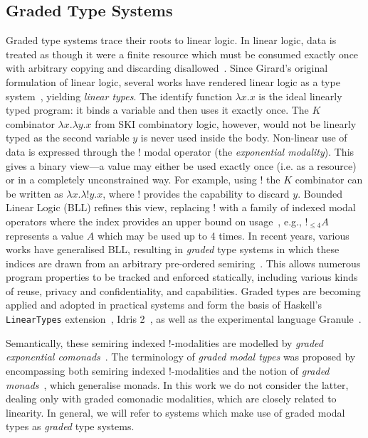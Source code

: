 \subsection{Graded Type Systems}

Graded type systems trace their roots to linear logic. In linear logic, data is
treated as though it were a finite resource which must be consumed exactly once
with arbitrary copying and discarding disallowed~\citep{girard1987linear}. Since
Girard's original formulation of linear logic, several works have rendered
linear logic as a type system~\citep{DBLP:conf/ifip2/Wadler90,ABRAMSKY19933},
yielding \emph{linear types}. The identify function $\lambda x . x$ is the ideal
linearly typed program: it binds a variable and then uses it exactly once. The
$K$ combinator $\lambda x . \lambda y . x$ from SKI combinatory logic, however,
would not be linearly typed as the second variable $y$ is never used inside the
body. Non-linear use of data is expressed through the $!$ modal operator (the
\emph{exponential modality}). This gives a binary view---a value may either be
used exactly once (i.e. as a resource) or in a completely unconstrained way. For
example, using $!$ the $K$ combinator can be written as $\lambda x. \lambda !y .
x$, where $!$ provides the capability to discard $y$. Bounded Linear Logic (BLL)
refines this view, replacing ! with a family of indexed modal operators where
the index provides an upper bound on usage~\citep{girard1992bounded}, e.g.,
$!_{\leq 4}A$ represents a value $A$ which may be used up to 4 times. In recent
years, various works have generalised BLL, resulting in \textit{graded} type
systems in which these indices are drawn from an arbitrary pre-ordered
semiring~\citep{DBLP:conf/esop/BrunelGMZ14,DBLP:conf/esop/GhicaS14,petricek2014coeffects,DBLP:journals/pacmpl/AbelB20,DBLP:journals/pacmpl/ChoudhuryEEW21,quantitative-type-theory,McBride2016}.
This allows numerous program properties to be tracked and enforced statically,
including various kinds of reuse, privacy and confidentiality, and capabilities.
Graded types are becoming applied and adopted in practical systems and form the
basis of Haskell's \texttt{LinearTypes}
extension~\citep{DBLP:journals/pacmpl/BernardyBNJS18}, Idris
2~\citep{DBLP:journals/corr/abs-2104-00480}, as well as the experimental
language Granule~\citep{DBLP:journals/pacmpl/OrchardLE19}.

Semantically, these semiring indexed $!$-modalities are modelled by \emph{graded
exponential comonads}~\citep{DBLP:conf/icfp/GaboardiKOBU16}. The terminology of
\textit{graded modal types} was proposed
by~\citet{DBLP:journals/pacmpl/OrchardLE19} encompassing both semiring indexed
!-modalities and the notion of \textit{graded
monads}~\citep{DBLP:journals/corr/OrchardPM14,DBLP:conf/popl/Katsumata14,
smirnov2008graded}, which generalise monads. In this work we do not consider the
latter, dealing only with graded comonadic modalities, which are closely related to
linearity. In general, we will refer to systems which make use of graded modal
types as \emph{graded} type systems. 

